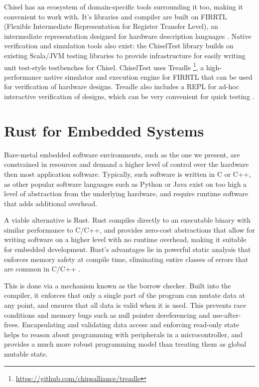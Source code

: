 Chisel has an ecosystem of domain-specific tools surrounding it too, making it convenient to work with. It's libraries and compiler are built on FIRRTL (Flexible Intermediate Representation for Register Transfer Level), an intermediate representation designed for hardware description languages \cite{firrtl}. Native verification and simulation tools also exist: the ChiselTest library builds on existing Scala/JVM testing libraries to provide infrastructure for easily writing unit test-style testbenches for Chisel. ChiselTest uses Treadle \footnote{\url{https://github.com/chipsalliance/treadle}}, a high-performance native simulator and execution engine for FIRRTL that can be used for verification of hardware designs. Treadle also includes a REPL for ad-hoc interactive verification of designs, which can be very convenient for quick testing \cite{chisel_site}.

\section{Rust for Embedded Systems}

Bare-metal embedded software environments, such as the one we present, are constrained in resources and demand a higher level of control over the hardware then most application software. Typically, such software is written in C or C++, as other popular software languages such as Python or Java exist on too high a level of abstraction from the underlying hardware, and require runtime software that adds additional overhead.

A viable alternative is Rust. Rust compiles directly to an executable binary with similar performance to C/C++, and provides zero-cost abstractions that allow for writing software on a higher level with no runtime overhead, making it suitable for embedded development. Rust's advantages lie in powerful static analysis that enforces memory safety at compile time, eliminating entire classes of errors that are common in C/C++ \cite{rust_good}.

This is done via a mechanism known as the borrow checker. Built into the compiler, it enforces that only a single part of the program can mutate data at any point, and ensures that all data is valid when it is used. This prevents race conditions and memory bugs such as null pointer dereferencing and use-after-frees. Encapsulating and validating data access and enforcing read-only state helps to reason about programming with peripherals in a microcontroller, and provides a much more robust programming model than treating them as global mutable state.

